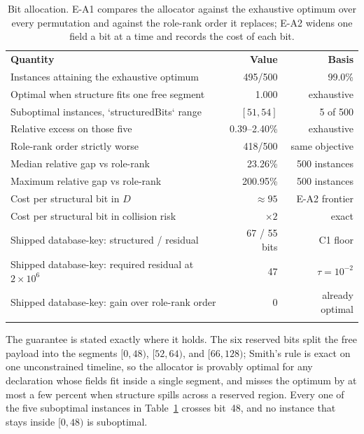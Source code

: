 \documentclass{svproc}
\begin{document}
\begin{table}[!ht]
\caption{Bit allocation. E-A1 compares the allocator against the exhaustive
optimum over every permutation and against the role-rank order it replaces;
E-A2 widens one field a bit at a time and records the cost of each bit.}
\label{tab:bit-allocation}
\centering\footnotesize
\begin{tabular*}{\columnwidth}{@{\extracolsep{\fill}}lrr}
\hline\noalign{\smallskip}
\textbf{Quantity} & \textbf{Value} & \textbf{Basis} \\
\noalign{\smallskip}\hline\noalign{\smallskip}
Instances attaining the exhaustive optimum & 495/500 & 99.0\% \\
Optimal when structure fits one free segment & 1.000 & exhaustive \\Suboptimal instances, `structuredBits` range & $[51,54]$ & 5 of 500 \\
Relative excess on those five & 0.39--2.40\% & exhaustive \\
Role-rank order strictly worse & 418/500 & same objective \\
Median relative gap vs role-rank & 23.26\% & 500 instances \\
Maximum relative gap vs role-rank & 200.95\% & 500 instances \\
Cost per structural bit in $D$ & $\approx 95$ & E-A2 frontier \\
Cost per structural bit in collision risk & $\times 2$ & exact \\
Shipped database-key: structured / residual & 67 / 55 bits & C1 floor \\
Shipped database-key: required residual at $2\times10^6$ & 47 & $\tau=10^{-2}$ \\
Shipped database-key: gain over role-rank order & 0 & already optimal \\
\noalign{\smallskip}\hline
\end{tabular*}
\end{table}

The guarantee is stated exactly where it holds. The six reserved bits split the
free payload into the segments $[0,48)$, $[52,64)$, and $[66,128)$; Smith's
rule is exact on one unconstrained timeline, so the allocator is provably
optimal for any declaration whose fields fit inside a single segment, and misses
the optimum by at most a few percent when structure spills across a reserved
region. Every one of the five suboptimal instances in Table~\ref{tab:bit-allocation}
crosses bit~48, and no instance that stays inside $[0,48)$ is suboptimal.
\end{document}
